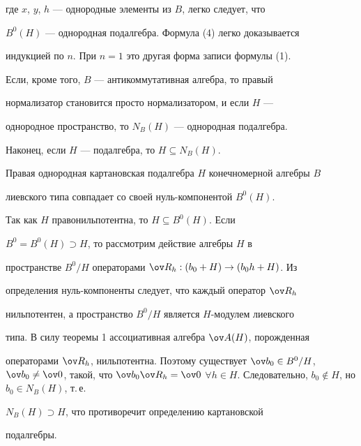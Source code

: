 где $x$, $y$, $h$ --- однородные элементы из $B$, легко следует, что 


$B^0(H)$ --- однородная подалгебра. Формула (4) легко доказывается 


индукцией по $n$. При $n=1$ это другая форма записи формулы (1). 


 


Если, кроме того, $B$ --- антикоммутативная алгебра, то правый 


нормализатор становится просто нормализатором, и если $H$ --- 


однородное пространство, то $N_B(H)$ --- однородная подалгебра. 


Наконец, если $H$ --- подалгебра, то $H\subseteq N_B(H)$. 


 


\begin{propnonum} 


Правая однородная картановская подалгебра $H$ конечномерной алгебры $B$ 


лиевского типа совпадает со своей нуль-компонентой $B^0(H)$. 


\end{propnonum} 


 


\begin{pf} 


Так как $H$ правонильпотентна, то $H\subseteq B^0(H)$. Если 


$B^0=B^0(H)\supset H$, то рассмотрим действие алгебры $H$ в 


пространстве $B^0/H$ операторами $\ov R_h:(b_0+H)\to(b_0h+H)$. Из 


определения нуль-компоненты следует, что каждый оператор $\ov R_h$ 


нильпотентен, а пространство $B^0/H$ является $H$-модулем лиевского 


типа. В силу теоремы 1 ассоциативная алгебра $\ov A(H)$, порожденная 


операторами $\ov R_h$, нильпотентна. Поэтому существует $\ov b_0\in 


B^0/H$, $\ov b_0\ne\ov 0$, такой, что $\ov b_0\ov R_h=\ov 0$ $\forall 


h\in H$. Следовательно, $b_0\notin H$, но $b_0\in N_B(H)$, т.\,е. 


$N_B(H)\supset H$, что противоречит определению картановской 


подалгебры. 


\end{pf} 


